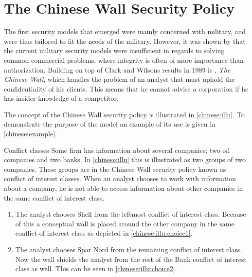 \section{The Chinese Wall Security Policy}
The first security models that emerged were mainly concerned with military, and were thus tailored to fit the needs of the military.
However, it was shown by \citet{clarkwilson1987commercial} that the current military security models were insufficient in regards to solving common commercial problems, where integrity is often of more importance than authorization.
Building on top of Clark and Wilsons results in 1989 is \citet{brewer1989chinese}, \emph{The Chinese Wall}, which handles the problem of an analyst that must uphold the confidentiality of his clients.
This means that he cannot advise a corporation if he has insider knowledge of a competitor.

The concept of the Chinese Wall security policy is illustrated in \cref{chinese:illu}.
To demonstrate the purpose of the model an example of its use is given in \cref{chinese:example}.

\begin{example}{Conflict classes}\label{chinese:example}
Some firm has information about several companies; two oil companies and two banks.
In \cref{chinese:illu} this is illustrated as two groups of two companies.
These groups are in the Chinese Wall security policy known as conflict of interest classes.
When an analyst chooses to work with information about a company, he is not able to access information about other companies in the same conflict of interest class.

\begin{enumerate}
    \item The analyst chooses Shell from the leftmost conflict of interest class.
    Because of this a conceptual wall is placed around the other company in the same conflict of interest class as depicted in \cref{chinese:illu:choice1}.
    \item The analyst chooses Spar Nord from the remaining conflict of interest class.
    Now the wall shields the analyst from the rest of the Bank conflict of interest class as well.
    This can be seen in \cref{chinese:illu:choice2}.
\end{enumerate}
\end{example}

